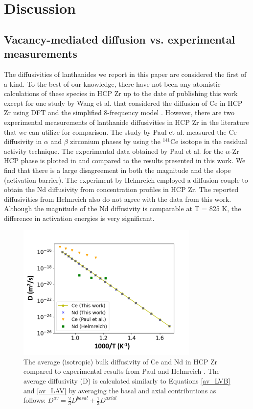 \documentclass[preprint,12pt]{elsarticle}
\begin{document}
\FloatBarrier

\section{Discussion}

\subsection{Vacancy-mediated diffusion vs. experimental measurements}
The diffusivities of lanthanides we report in this paper are considered the first of a kind. To the best of our knowledge, there have not been any atomistic calculations of these species in HCP Zr up to the date of publishing this work except for one study by Wang et al. that considered the diffusion of Ce in HCP Zr using DFT and the simplified 8-frequency model \cite{wang_first_2019}. However, there are two experimental measurements of lanthanide diffusivities in HCP Zr in the literature that we can utilize for comparison. The study by Paul et al. \cite{paul_diffusion_1968} measured the Ce diffusivity in $\alpha$ and $\beta$ zirconium phases by using the $^{141}$Ce isotope in the residual activity technique. The experimental data obtained by Paul et al.\cite{paul_diffusion_1968} for the $\alpha$-Zr HCP phase is plotted in  and compared to the results presented in this work. We find that there is a large disagreement in both the magnitude and the slope (activation barrier). The experiment by Helmreich \cite{helmreich_diffusion_2014} employed a diffusion couple to obtain the Nd diffusivity from concentration profiles in HCP Zr. The reported diffusivities from Helmreich also do not agree with the data from this work. Although the magnitude of the Nd diffusivity is comparable at T = 825 K, the difference in activation energies is very significant.

\begin{figure}[h!]
    \centering
    \includegraphics[width=0.8\textwidth]{ce_nd_diff_exp_updated.jpg}
    \caption{The average (isotropic) bulk diffusivity of Ce and Nd in HCP Zr compared to experimental results from Paul \cite{paul_diffusion_1968} and Helmreich \cite{helmreich_diffusion_2014}. The average diffusivity (D) is calculated similarly to Equations \ref{av_LVB} and \ref{av_LAV} by averaging the basal and axial contributions as follows: $D^{av} = \frac{2}{3} D^{basal} + \frac{1}{3} D^{axial}$}
    \label{fig:ce_nd_exp}
\end{figure}
\end{document}
